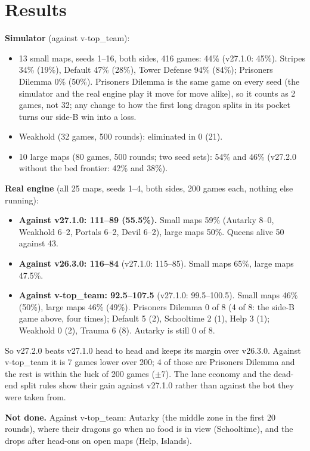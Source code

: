 \documentclass[11pt,a4paper]{article}
\begin{document}
\section{Results}\label{sec:v272results}
\textbf{Simulator} (against v-top\_team):
\begin{itemize}
  \item 13 small maps, seeds 1--16, both sides, 416 games: 44\% (v27.1.0: 45\%). Stripes 34\% (19\%), Default 47\%
        (28\%), Tower Defense 94\% (84\%); Prisoners Dilemma 0\% (50\%). Prisoners Dilemma is the same game on every seed (the
        simulator and the real engine play it move for move alike), so it counts as 2 games, not 32; any change to how the
        first long dragon splits in its pocket turns our side-B win into a loss.
  \item Weakhold (32 games, 500 rounds): eliminated in 0 (21).
  \item 10 large maps (80 games, 500 rounds; two seed sets): 54\% and 46\% (v27.2.0 without the bed frontier: 42\% and 38\%).
\end{itemize}
\textbf{Real engine} (all 25 maps, seeds 1--4, both sides, 200 games each, nothing else running):
\begin{itemize}
  \item \textbf{Against v27.1.0: 111--89 (55.5\%).} Small maps 59\% (Autarky 8--0, Weakhold 6--2, Portals 6--2, Devil 6--2),
        large maps 50\%. Queens alive 50 against 43.
  \item \textbf{Against v26.3.0: 116--84} (v27.1.0: 115--85). Small maps 65\%, large maps 47.5\%.
  \item \textbf{Against v-top\_team: 92.5--107.5} (v27.1.0: 99.5--100.5). Small maps 46\% (50\%), large maps 46\% (49\%).
        Prisoners Dilemma 0 of 8 (4 of 8: the side-B game above, four times); Default 5 (2), Schooltime 2 (1), Help 3 (1);
        Weakhold 0 (2), Trauma 6 (8). Autarky is still 0 of 8.
\end{itemize}
So v27.2.0 beats v27.1.0 head to head and keeps its margin over v26.3.0. Against v-top\_team it is 7 games lower over 200;
4 of those are Prisoners Dilemma and the rest is within the luck of 200 games ($\pm$7). The lane economy and the dead-end
split rules show their gain against v27.1.0 rather than against the bot they were taken from.

\textbf{Not done.} Against v-top\_team: Autarky (the middle zone in the first 20 rounds), where their dragons go when no food
is in view (Schooltime), and the drops after head-ons on open maps (Help, Islands).
\end{document}
